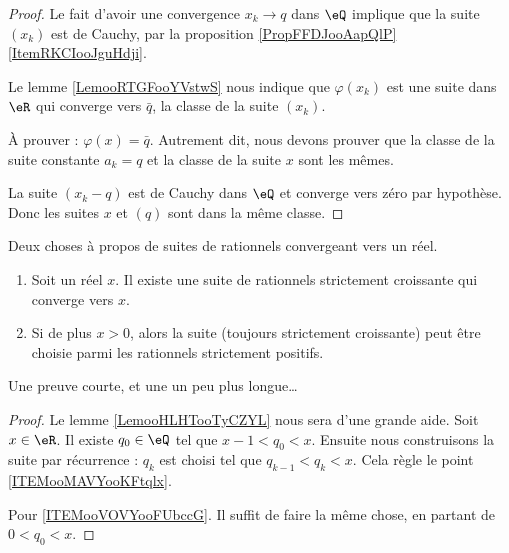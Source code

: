 \begin{proof}
    Le fait d'avoir une convergence \( x_k\to q\) dans \( \eQ\) implique que la suite \( (x_k)\) est de Cauchy, par la proposition \ref{PropFFDJooAapQlP}\ref{ItemRKCIooJguHdji}.
    
    Le lemme \ref{LemooRTGFooYVstwS} nous indique que \( \varphi(x_k)\) est une suite dans \( \eR\) qui converge vers \( \bar q\), la classe de la suite \( (x_k)\).

    À prouver : \( \varphi(x)=\bar q\). Autrement dit, nous devons prouver que la classe de la suite constante \( a_k=q\) et la classe de la suite \( x\) sont les mêmes.

    La suite \( (x_k-q)\) est de Cauchy dans \( \eQ\) et converge vers zéro par hypothèse. Donc les suites \(x\) et \( (q)\) sont dans la même classe.
\end{proof}

\begin{proposition}     \label{PROPooFGBOooHiZqbs}
    Deux choses à propos de suites de rationnels convergeant vers un réel.
    \begin{enumerate}
        \item       \label{ITEMooMAVYooKFtqlx}
    Soit un réel \( x\). Il existe une suite de rationnels strictement croissante qui converge vers \( x\).
\item       \label{ITEMooVOVYooFUbccG}
    Si de plus \( x>0\), alors la suite (toujours strictement croissante) peut être choisie parmi les rationnels strictement positifs.
    \end{enumerate}
\end{proposition}
Une preuve courte, et une un peu plus longue\dots

\begin{proof}
    Le lemme \ref{LemooHLHTooTyCZYL} nous sera d'une grande aide. Soit \( x\in \eR\). Il existe \( q_0\in \eQ\) tel que \( x-1<q_0<x\). Ensuite nous construisons la suite par récurrence : \( q_k\) est choisi tel que \( q_{k-1}<q_k<x\). Cela règle le point \ref{ITEMooMAVYooKFtqlx}.

    Pour \ref{ITEMooVOVYooFUbccG}. Il suffit de faire la même chose, en partant de \( 0<q_0<x\).
\end{proof}

